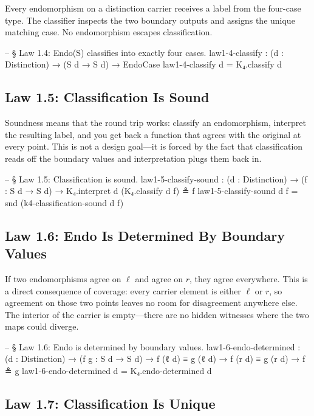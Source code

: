 \documentclass[11pt,a4paper]{book}
\begin{document}
Every endomorphism on a distinction carrier receives a label from the four-case type. The classifier inspects the two boundary outputs and assigns the unique matching case. No endomorphism escapes classification.

\begin{code}
-- § Law 1.4: Endo(S) classifies into exactly four cases.
law1-4-classify : (d : Distinction) → (S d → S d) → EndoCase
law1-4-classify d = K₄.classify d
\end{code}

\subsection{Law 1.5: Classification Is Sound}

Soundness means that the round trip works: classify an endomorphism, interpret the resulting label, and you get back a function that agrees with the original at every point. This is not a design goal—it is forced by the fact that classification reads off the boundary values and interpretation plugs them back in.

\begin{code}
-- § Law 1.5: Classification is sound.
law1-5-classify-sound : (d : Distinction) → (f : S d → S d) → K₄.interpret d (K₄.classify d f) ≗ f
law1-5-classify-sound d f = snd (k4-classification-sound d f)
\end{code}

\subsection{Law 1.6: Endo Is Determined By Boundary Values}

If two endomorphisms agree on $\ell$ and agree on $r$, they agree everywhere. This is a direct consequence of coverage: every carrier element is either $\ell$ or $r$, so agreement on those two points leaves no room for disagreement anywhere else. The interior of the carrier is empty—there are no hidden witnesses where the two maps could diverge.

\begin{code}
-- § Law 1.6: Endo is determined by boundary values.
law1-6-endo-determined :
  (d : Distinction) →
  (f g : S d → S d) →
  f (ℓ d) ≡ g (ℓ d) →
  f (r d) ≡ g (r d) →
  f ≗ g
law1-6-endo-determined d = K₄.endo-determined d
\end{code}

\subsection{Law 1.7: Classification Is Unique}
\end{document}

